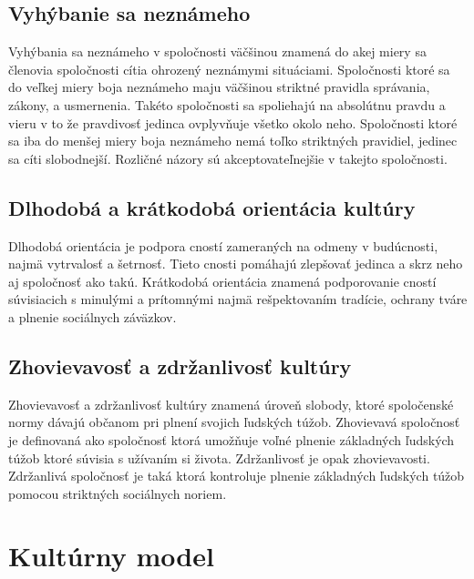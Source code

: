 \documentclass[10pt,twoside,slovak,a4paper]{article}
\begin{document}
\subsection{Vyhýbanie sa neznámeho}\label{kultura:vyhybanie}

Vyhýbania sa neznámeho v spoločnosti väčšinou znamená do akej miery sa členovia spoločnosti
cítia ohrozený neznámymi situáciami. Spoločnosti ktoré sa do veľkej miery boja neznámeho
maju väčšinou striktné pravidla správania, zákony, a usmernenia. Takéto spoločnosti sa spoliehajú
na absolútnu pravdu a vieru v to že pravdivosť jedinca ovplyvňuje všetko okolo neho. Spoločnosti
ktoré sa iba do menšej miery boja neznámeho nemá toľko striktných pravidiel, jedinec sa cíti
slobodnejší. Rozličné názory sú akceptovateľnejšie v takejto spoločnosti.

\subsection{Dlhodobá a krátkodobá orientácia kultúry}\label{kultura:cnosti}

Dlhodobá orientácia je podpora cností zameraných na odmeny v budúcnosti, najmä vytrvalosť a šetrnosť.
Tieto cnosti pomáhajú zlepšovať jedinca a skrz neho aj spoločnosť ako takú. Krátkodobá orientácia
znamená podporovanie cností súvisiacich s minulými a prítomnými najmä rešpektovaním tradície, ochrany
tváre a plnenie sociálnych záväzkov.

\subsection{Zhovievavosť a zdržanlivosť kultúry}\label{kultura:obmedzenia}

Zhovievavosť a zdržanlivosť kultúry znamená úroveň slobody, ktoré spoločenské normy
dávajú občanom pri plnení svojich ľudských túžob. Zhovievavá spoločnosť je definovaná
ako spoločnosť ktorá umožňuje voľné plnenie základných ľudských túžob ktoré súvisia s
užívaním si života. Zdržanlivosť je opak zhovievavosti. Zdržanlivá spoločnosť je taká
ktorá kontroluje plnenie základných ľudských túžob pomocou striktných sociálnych noriem.

\section{Kultúrny model}\label{model}
\end{document}
